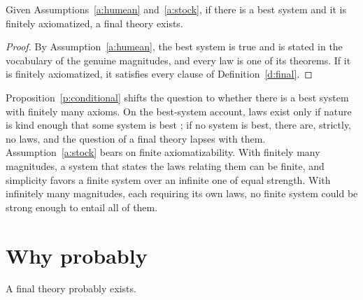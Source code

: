 \documentclass{situationist-preprint}
\begin{document}
\begin{proposition}\label{p:conditional}
Given Assumptions~\ref{a:humean} and~\ref{a:stock}, if there is a best system and it is finitely axiomatized, a final theory exists.
\end{proposition}

\begin{proof}
By Assumption~\ref{a:humean}, the best system is true and is stated in the vocabulary of the genuine magnitudes, and every law is one of its theorems. If it is finitely axiomatized, it satisfies every clause of Definition~\ref{d:final}.
\end{proof}

Proposition~\ref{p:conditional} shifts the question to whether there is a best system with finitely many axioms. On the best-system account, laws exist only if nature is kind enough that some system is best \citep{Lewis1994}; if no system is best, there are, strictly, no laws, and the question of a final theory lapses with them. Assumption~\ref{a:stock} bears on finite axiomatizability. With finitely many magnitudes, a system that states the laws relating them can be finite, and simplicity favors a finite system over an infinite one of equal strength. With infinitely many magnitudes, each requiring its own laws, no finite system could be strong enough to entail all of them.

\section{Why probably}\label{s:probably}

\begin{theorem}\label{t:probably}
A final theory probably exists.
\end{theorem}
\end{document}
